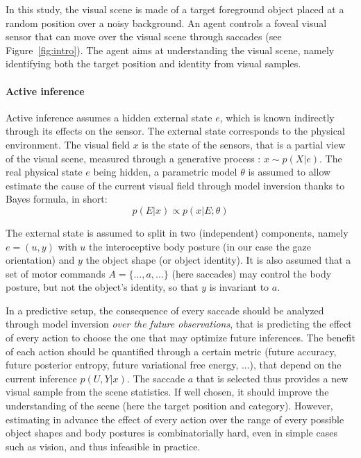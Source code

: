 In this study, the visual scene is made of a target foreground object placed at a random position over a noisy background. An agent controls a foveal visual sensor that can move over the visual scene through saccades (see Figure~\ref{fig:intro}). 
The agent aims at understanding the visual scene, namely identifying both the target position and identity from visual samples.

\paragraph{Active inference}
Active inference assumes a hidden external state $e$, which is known indirectly through its effects on the sensor. The external state  corresponds to the physical environment. The visual field $x$ is the state of the sensors, that is a partial view of the visual scene, measured through a generative process : $x\sim p(X|e)$. The real physical state $e$ being hidden, a parametric model $\theta$ is assumed to allow estimate the cause of the current visual field through model inversion thanks to Bayes formula, in short:
$$p(E|x) \propto p(x|E;\theta)$$


The external state is assumed to split in two (independent) components, namely $e = (u,y)$ with $u$ the interoceptive body posture (in our case the gaze orientation) and $y$ the object shape (or object identity).
It is also assumed that a set of motor commands $A = \{..., a, ...\}$ (here saccades) may control the body posture, but not the object's identity, so that $y$ is invariant to $a$.

In a predictive setup, the consequence of every saccade should be analyzed through model inversion \emph{over the future observations}, that is predicting the effect of every action to choose the one that may optimize future inferences. The benefit of each action should be quantified through a certain metric (future accuracy, future posterior entropy, future variational free energy, ...), that depend on the current inference $p(U,Y|x)$. The saccade $a$ that is selected thus provides a new visual sample from the scene statistics. If well chosen, it should improve the understanding of the scene (here the target position and category). However, estimating in advance the effect of every action over the range of every possible object shapes and body postures is combinatorially hard, even in simple cases such as vision, and thus infeasible in practice.

